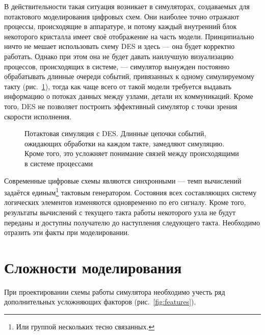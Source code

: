 В действительности такая ситуация возникает в симуляторах, создаваемых для потактового моделирования  цифровых схем. Они наиболее точно отражают процессы, происходящие в аппаратуре, и потому каждый внутренний блок некоторого кристалла имеет своё отображение на часть модели. Принципиально ничто не мешает использовать схему DES и здесь — она будет корректно работать. Однако при этом она не будет давать наилучшую визуализацию процессов, происходящих в системе, — симулятор вынужден постоянно обрабатывать длинные очереди событий, привязанных к одному симулируемому такту (рис.~\ref{fig:des-long}), тогда как чаще всего от такой модели требуется выдавать информацию о потоках данных между узлами, детали их коммуникаций. Кроме того, DES не позволяет построить эффективный симулятор с точки зрения скорости исполнения.

\begin{figure}[htbp]
    \centering
    \caption[Потактовая симуляция с DES]{Потактовая симуляция с DES. Длинные цепочки событий, ожидающих обработки на каждом такте, замедляют симуляцию. Кроме того, это усложняет понимание связей между происходящими в системе процессами}
    \label{fig:des-long}
\end{figure}

Современные цифровые схемы являются синхронными — темп вычислений задаётся единым\footnote{Или группой нескольких тесно связанных.}  тактовым генератором. Состояния всех составляющих систему логических элементов изменяются одновременно по его сигналу. Кроме того, результаты вычислений с текущего такта работы некоторого узла не будут переданы и доступны получателю до наступления следующего такта. Необходимо отразить эти факты при моделировании.

\section{Сложности моделирования}

При проектировании схемы работы симулятора необходимо учесть ряд дополнительных усложняющих факторов (рис.~\ref{fig:features}).

